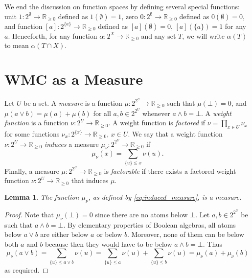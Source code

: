 \documentclass{article}
\newtheorem{lemma}{Lemma}
\theoremstyle{definition}
\theoremstyle{remark}
\begin{document}
{We end the discussion on function spaces by defining several special functions:
unit $1\colon 2^\emptyset \to \mathbb{R}_{\ge 0}$ defined as $1(\emptyset) = 1$,
zero $0\colon 2^\emptyset \to \mathbb{R}_{\ge 0}$ defined as $0(\emptyset) = 0$,
and function $[a]\colon 2^{\{a\}} \to \mathbb{R}_{\ge 0}$ defined as
$[a](\emptyset) = 0$, $[a](\{a\}) = 1$ for any $a$. Henceforth, for any function
$\alpha\colon 2^X \to \mathbb{R}_{\ge 0}$ and any set $T$, we will write
$\alpha(T)$ to mean $\alpha(T \cap X)$.

\section{WMC as a Measure}

Let $U$ be a set. A \emph{measure} is a function $\mu\colon 2^{2^U} \to
\mathbb{R}_{\ge 0}$ such that $\mu(\bot) = 0$, and $\mu(a \lor b) = \mu(a) +
\mu(b)$ for all $a, b \in 2^{2^U}$ whenever $a \land b = \bot$. A \emph{weight
  function} is a function $\nu\colon 2^U \to \mathbb{R}_{\ge 0}$. A weight
function is \emph{factored} if $\nu = \prod_{x \in U} \nu_x$ for some functions
$\nu_x\colon 2^{\{x\}} \to \mathbb{R}_{\ge 0}$, $x \in U$. We say that a weight
function $\nu\colon 2^U \to \mathbb{R}_{\ge 0}$ \emph{induces} a measure
$\mu_\nu\colon 2^{2^U} \to \mathbb{R}_{\ge 0}$ if
\begin{equation} \label{eq:induced_measure}
  \mu_\nu(x) = \sum_{\{u\} \le x} \nu(u).
\end{equation}
Finally, a measure $\mu\colon 2^{2^U} \to \mathbb{R}_{\ge 0}$ is
\emph{factorable} if there exists a factored weight function $\nu\colon 2^U \to
\mathbb{R}_{\ge 0}$ that induces $\mu$.

\begin{lemma} \label{prop:measure}
  The function $\mu_\nu$, as defined by \cref{eq:induced_measure}, is a measure.
\end{lemma}
\begin{proof}
  Note that $\mu_\nu(\bot) = 0$ since there are no atoms below $\bot$. Let $a, b
  \in 2^{2^{U}}$ be such that $a \land b = \bot$. By elementary properties of
  Boolean algebras, all atoms below $a \lor b$ are either below $a$ or below
  $b$. Moreover, none of them can be below both $a$ and $b$ because then they
  would have to be below $a \land b = \bot$. Thus
  \[
    \mu_\nu(a \lor b) = \sum_{\{u\} \le a \lor b} \nu(u) = \sum_{\{u\} \le a}
    \nu(u) + \sum_{\{u\} \le b} \nu(u) = \mu_\nu(a) + \mu_\nu(b)
  \]
  as required.
\end{proof}

}
\end{document}
